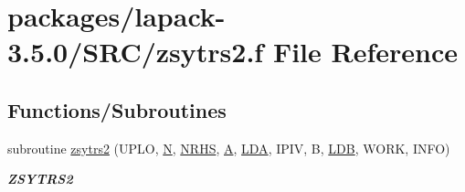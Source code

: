 \hypertarget{zsytrs2_8f}{}\section{packages/lapack-\/3.5.0/\+S\+R\+C/zsytrs2.f File Reference}
\label{zsytrs2_8f}
\subsection*{Functions/\+Subroutines}
\begin{DoxyCompactItemize}
\item 
subroutine \hyperlink{group__complex16SYcomputational_ga6e528ee8d9023897010bf54f0763c350}{zsytrs2} (U\+P\+L\+O, \hyperlink{polmisc_8c_a0240ac851181b84ac374872dc5434ee4}{N}, \hyperlink{example__user_8c_aa0138da002ce2a90360df2f521eb3198}{N\+R\+H\+S}, \hyperlink{classA}{A}, \hyperlink{example__user_8c_ae946da542ce0db94dced19b2ecefd1aa}{L\+D\+A}, I\+P\+I\+V, B, \hyperlink{example__user_8c_a50e90a7104df172b5a89a06c47fcca04}{L\+D\+B}, W\+O\+R\+K, I\+N\+F\+O)
\begin{DoxyCompactList}\small\item\em {\bfseries Z\+S\+Y\+T\+R\+S2} \end{DoxyCompactList}\end{DoxyCompactItemize}
